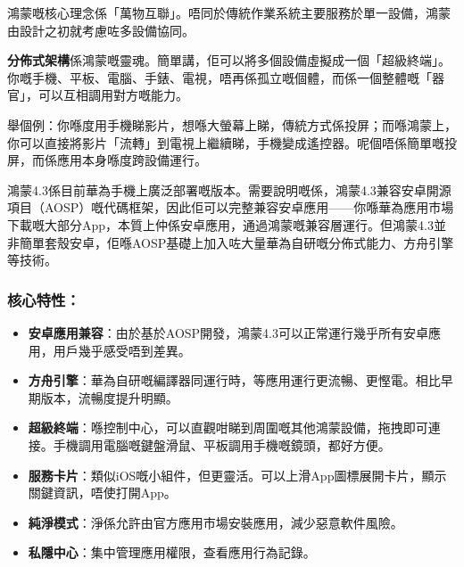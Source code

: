 


鴻蒙嘅核心理念係「萬物互聯」。唔同於傳統作業系統主要服務於單一設備，鴻蒙由設計之初就考慮咗多設備協同。

\textbf{分佈式架構}係鴻蒙嘅靈魂。簡單講，佢可以將多個設備虛擬成一個「超級終端」。你嘅手機、平板、電腦、手錶、電視，唔再係孤立嘅個體，而係一個整體嘅「器官」，可以互相調用對方嘅能力。

舉個例：你喺度用手機睇影片，想喺大螢幕上睇，傳統方式係投屏；而喺鴻蒙上，你可以直接將影片「流轉」到電視上繼續睇，手機變成遙控器。呢個唔係簡單嘅投屏，而係應用本身喺度跨設備運行。


鴻蒙4.3係目前華為手機上廣泛部署嘅版本。需要說明嘅係，鴻蒙4.3兼容安卓開源項目（AOSP）嘅代碼框架，因此佢可以完整兼容安卓應用——你喺華為應用市場下載嘅大部分App，本質上仲係安卓應用，通過鴻蒙嘅兼容層運行。但鴻蒙4.3並非簡單套殼安卓，佢喺AOSP基礎上加入咗大量華為自研嘅分佈式能力、方舟引擎等技術。

\subsubsection*{核心特性：}

\begin{itemize}
  \item \textbf{安卓應用兼容}：由於基於AOSP開發，鴻蒙4.3可以正常運行幾乎所有安卓應用，用戶幾乎感受唔到差異。
  \item \textbf{方舟引擎}：華為自研嘅編譯器同運行時，等應用運行更流暢、更慳電。相比早期版本，流暢度提升明顯。
  \item \textbf{超級終端}：喺控制中心，可以直觀咁睇到周圍嘅其他鴻蒙設備，拖拽即可連接。手機調用電腦嘅鍵盤滑鼠、平板調用手機嘅鏡頭，都好方便。
  \item \textbf{服務卡片}：類似iOS嘅小組件，但更靈活。可以上滑App圖標展開卡片，顯示關鍵資訊，唔使打開App。
  \item \textbf{純淨模式}：淨係允許由官方應用市場安裝應用，減少惡意軟件風險。
  \item \textbf{私隱中心}：集中管理應用權限，查看應用行為記錄。
\end{itemize}

